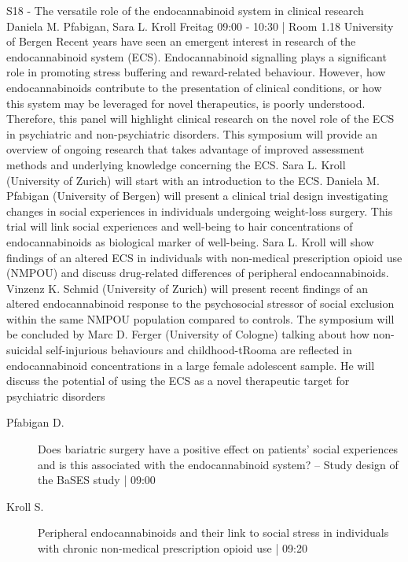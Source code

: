 
            \begin{symposium}
            {S18 - The versatile role of the endocannabinoid system in clinical research}
            {Daniela M. Pfabigan, Sara L. Kroll}
            {Freitag 09:00 - 10:30 | Room 1.18}
            {University of Bergen}
            Recent years have seen an emergent interest in research of the endocannabinoid system (ECS). Endocannabinoid signalling plays a significant role in promoting stress buffering and reward-related behaviour. However, how endocannabinoids contribute to the presentation of clinical conditions, or how this system may be leveraged for novel therapeutics, is poorly understood. Therefore, this panel will highlight clinical research on the novel role of the ECS in psychiatric and non-psychiatric disorders.
This symposium will provide an overview of ongoing research that takes advantage of improved assessment methods and underlying knowledge concerning the ECS. Sara L. Kroll (University of Zurich) will start with an introduction to the ECS. Daniela M. Pfabigan (University of Bergen) will present a clinical trial design investigating changes in social experiences in individuals undergoing weight-loss surgery. This trial will link social experiences and well-being to hair concentrations of endocannabinoids as biological marker of well-being. Sara L. Kroll will show findings of an altered ECS in individuals with non-medical prescription opioid use (NMPOU) and discuss drug-related differences of peripheral endocannabinoids. Vinzenz K. Schmid (University of Zurich) will present recent findings of an altered endocannabinoid response to the psychosocial stressor of social exclusion within the same NMPOU population compared to controls. The symposium will be concluded by Marc D. Ferger (University of Cologne) talking about how non-suicidal self-injurious behaviours and childhood-tRooma are reflected in endocannabinoid concentrations in a large female adolescent sample. He will discuss the potential of using the ECS as a novel therapeutic target for psychiatric disorders
            \begin{description}    
            
                \item [ Pfabigan D.] Does bariatric surgery have a positive effect on patients’ social experiences and is this associated with the endocannabinoid system? – Study design of the BaSES study \textcolor{mygray}{ | 09:00}    
                
                \item [ Kroll S.] Peripheral endocannabinoids and their link to social stress in individuals with chronic non-medical prescription opioid use \textcolor{mygray}{ | 09:20}    
                

\end{description}
\end{symposium}
